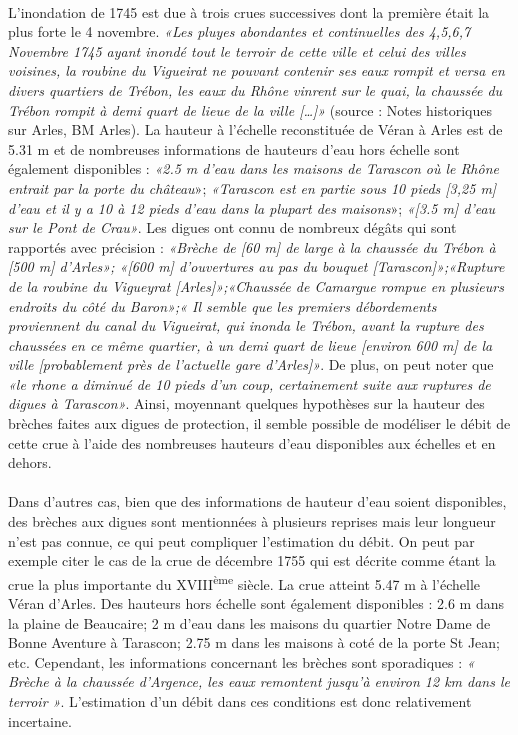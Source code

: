 	\paragraph{} L'inondation de 1745 est due à trois crues successives dont la première était la plus forte le 4 novembre. \textit{«Les pluyes abondantes et continuelles des 4,5,6,7 Novembre 1745 ayant inondé tout le terroir de cette ville et celui des villes voisines, la roubine du Vigueirat ne pouvant contenir ses eaux rompit et versa en divers quartiers de Trébon, les eaux du Rhône vinrent sur le quai, la chaussée du Trébon rompit à demi quart de lieue de la ville […]»} (source : Notes historiques sur Arles, BM Arles). La hauteur à l'échelle reconstituée de Véran à Arles est de 5.31 m et de nombreuses informations de hauteurs d'eau hors échelle sont également disponibles : \textit{«2.5 m d'eau dans les maisons de Tarascon où le Rhône entrait par la porte du château}»; \textit{«Tarascon est en partie sous 10 pieds [3,25 m] d'eau et il y a 10 à 12 pieds d'eau dans la plupart des maisons}»; \textit{«[3.5 m] d'eau sur le Pont de Crau»}. Les digues ont connu de nombreux dégâts qui sont rapportés avec précision : \textit{«Brèche de [60 m] de large à la chaussée du Trébon à [500 m] d'Arles»; «[600 m] d'ouvertures au pas du bouquet [Tarascon]»;«Rupture de la roubine du Vigueyrat [Arles]»;«Chaussée de Camargue rompue en plusieurs endroits du côté du Baron»;« Il semble que les premiers débordements proviennent du canal du Vigueirat, qui inonda le Trébon, avant la rupture des chaussées en ce même quartier, à un demi quart de lieue [environ 600 m] de la ville [probablement près de l'actuelle gare d’Arles]»}. De plus, on peut noter que \textit{«le rhone a diminué de 10 pieds d'un coup, certainement suite aux ruptures de digues à Tarascon»}. Ainsi, moyennant quelques hypothèses sur la hauteur des brèches faites aux digues de protection, il semble possible de modéliser le débit de cette crue à l'aide des nombreuses hauteurs d'eau disponibles aux échelles et en dehors. 

	\paragraph{} Dans d'autres cas, bien que des informations de hauteur d'eau soient disponibles, des brèches aux digues sont mentionnées à plusieurs reprises mais leur longueur n'est pas connue, ce qui peut compliquer l'estimation du débit. On peut par exemple citer le cas de la crue de décembre 1755 qui est décrite comme étant la crue la plus importante du XVIII\textsuperscript{ème} siècle. La crue atteint 5.47 m à l'échelle Véran d'Arles. Des hauteurs hors échelle sont également disponibles : 2.6 m dans la plaine de Beaucaire; 2 m d'eau dans les maisons du quartier Notre Dame de Bonne Aventure à Tarascon; 2.75 m dans les maisons à coté de la porte St Jean; etc. Cependant, les informations concernant les brèches sont sporadiques : \textit{« Brèche à la chaussée d'Argence, les eaux remontent jusqu'à environ 12 km dans le terroir »}. L'estimation d'un débit dans ces conditions est donc relativement incertaine.
  	
